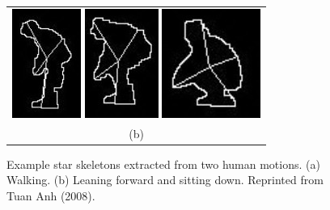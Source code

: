 \begin{figure}[t]
\begin{tabular}{c}
    \includegraphics{figures/star-sit-02.jpg} 
    \includegraphics{figures/star-sit-03.jpg} 
    \includegraphics{figures/star-sit-04.jpg} \\
    (b)
  \end{tabular}
  \caption[Example star skeletons.]{\small Example star skeletons
    extracted from two human motions. (a) Walking. (b) Leaning forward
    and sitting down. Reprinted from Tuan Anh
    (2008)\nocite{anh08thesis}.}
  \label{fig:star-skeleton-example} 
\end{figure}

